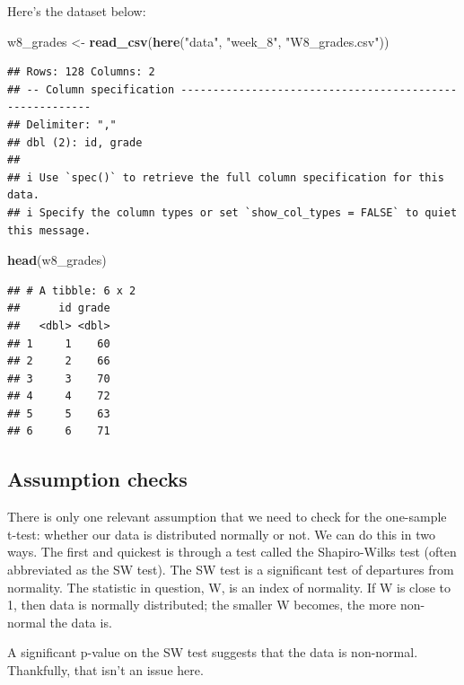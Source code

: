 \documentclass[
]{book}
\newenvironment{Shaded}{\begin{snugshade}}{\end{snugshade}}
\newcommand{\FunctionTok}[1]{\textcolor[rgb]{0.13,0.29,0.53}{\textbf{#1}}}
\newcommand{\NormalTok}[1]{#1}
\newcommand{\OtherTok}[1]{\textcolor[rgb]{0.56,0.35,0.01}{#1}}
\newcommand{\StringTok}[1]{\textcolor[rgb]{0.31,0.60,0.02}{#1}}
\begin{document}
Here's the dataset below:

\begin{Shaded}
\begin{Highlighting}[]
\NormalTok{w8\_grades }\OtherTok{\textless{}{-}} \FunctionTok{read\_csv}\NormalTok{(}\FunctionTok{here}\NormalTok{(}\StringTok{"data"}\NormalTok{, }\StringTok{"week\_8"}\NormalTok{, }\StringTok{"W8\_grades.csv"}\NormalTok{))}
\end{Highlighting}
\end{Shaded}

\begin{verbatim}
## Rows: 128 Columns: 2
## -- Column specification --------------------------------------------------------
## Delimiter: ","
## dbl (2): id, grade
## 
## i Use `spec()` to retrieve the full column specification for this data.
## i Specify the column types or set `show_col_types = FALSE` to quiet this message.
\end{verbatim}

\begin{Shaded}
\begin{Highlighting}[]
\FunctionTok{head}\NormalTok{(w8\_grades)}
\end{Highlighting}
\end{Shaded}

\begin{verbatim}
## # A tibble: 6 x 2
##      id grade
##   <dbl> <dbl>
## 1     1    60
## 2     2    66
## 3     3    70
## 4     4    72
## 5     5    63
## 6     6    71
\end{verbatim}

\subsection{Assumption checks}\label{assumption-checks}

There is only one relevant assumption that we need to check for the one-sample t-test: whether our data is distributed normally or not. We can do this in two ways. The first and quickest is through a test called the Shapiro-Wilks test (often abbreviated as the SW test). The SW test is a significant test of departures from normality. The statistic in question, W, is an index of normality. If W is close to 1, then data is normally distributed; the smaller W becomes, the more non-normal the data is.

A significant p-value on the SW test suggests that the data is non-normal. Thankfully, that isn't an issue here.
\end{document}
